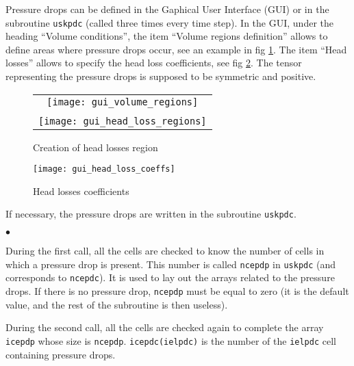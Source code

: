 {{{Pressure drops can be defined in the Gaphical User Interface (GUI) or in the subroutine \texttt{uskpdc} (called three times every time step). In the GUI, under the heading ``Volume conditions'', the item ``Volume regions definition'' allows to define areas where pressure drops occur, see an example in fig \ref{fig:hl1}. The item ``Head losses'' allows to specify the head loss coefficients, see fig \ref{fig:hl2}. The tensor representing the pressure drops is supposed to be symmetric
and positive.

\begin{figure}[!ht]
\begin{center}
\begin{tabular}{c}
\texttt{[image: gui\_volume\_regions]} \\
\\
\texttt{[image: gui\_head\_loss\_regions]}
\end{tabular}
\caption{Creation of head losses region}
\label{fig:hl1}
\end{center}
\end{figure}
%
\begin{figure}[!ht]
\begin{center}
\texttt{[image: gui\_head\_loss\_coeffs]}
\caption{Head losses coefficients}
\label{fig:hl2}
\end{center}
\end{figure}

If necessary, the pressure drops are written in the
subroutine \texttt{uskpdc}.

\begin{list}{$\bullet$}{}
\item During the first call, all the cells are checked to know the
      number of cells in which a pressure drop is present.
      This number is called \texttt{ncepdp} in
      \texttt{uskpdc} (and corresponds to
      \texttt{ncepdc}). It is used to lay out the arrays
      related to the pressure drops. If there is no pressure drop,
      \texttt{ncepdp} must be equal to zero (it is the default value, and the
      rest of the subroutine is then useless).

\item During the second call, all the cells are checked again to
      complete the array \texttt{icepdp} whose size is
      \texttt{ncepdp}. \mbox{\texttt{icepdc(ielpdc)}} is the number of the
      \texttt{ielpdc}\raisebox{1ex}{\small th} cell containing pressure drops.


\end{list}}}}
